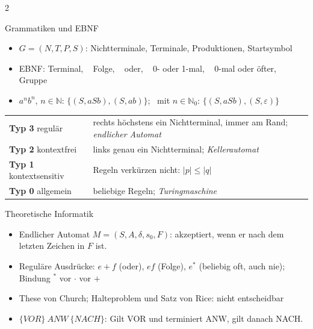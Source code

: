 \documentclass[fontsize=10pt,a4paper,DIV=20,headsepline]{scrartcl}
\newenvironment{kl}{\begin{itemize}[leftmargin=3mm, itemsep=0.1mm, topsep=0.3mm, parsep=0pt, label=\textcolor{diagramm}{\textbullet}]}{\end{itemize}}
\begin{document}
\begin{multicols}{2}
\begin{fs}{Grammatiken und EBNF}
\begin{kl}
\item $G = (N, T, P, S)$: Nichtterminale, Terminale, Produktionen, Startsymbol
\item EBNF:  Terminal, \  Folge, \  oder, \ \code{[A]} 0- oder 1-mal, \  0-mal oder öfter, \  Gruppe
\item $a^n b^n$, $n \in \mathbb{N}$: $\{(S, aSb), (S, ab)\}$; \ mit $n \in \mathbb{N}_0$: $\{(S, aSb), (S, \varepsilon)\}$
\end{kl}
\smallskip
{\scriptsize\setlength{\tabcolsep}{3pt}
\begin{tabular}{@{}p{2.3cm}p{5.6cm}@{}}
\textbf{Typ 3} regulär & rechts höchstens ein Nichtterminal, immer am Rand; \emph{endlicher Automat} \\
\textbf{Typ 2} kontextfrei & links genau ein Nichtterminal; \emph{Kellerautomat} \\
\textbf{Typ 1} kontextsensitiv & Regeln verkürzen nicht: $|p| \leq |q|$ \\
\textbf{Typ 0} allgemein & beliebige Regeln; \emph{Turingmaschine}
\end{tabular}}
\end{fs}

\begin{fs}{Theoretische Informatik}
\begin{kl}
\item Endlicher Automat $M = (S, A, \delta, s_0, F)$: akzeptiert, wenn er nach dem letzten Zeichen in $F$ ist.
\item Reguläre Ausdrücke: $e + f$ (oder), $ef$ (Folge), $e^*$ (beliebig oft, auch nie); Bindung $^*$ vor $\cdot$ vor $+$
\item These von Church; Halteproblem und Satz von Rice: nicht entscheidbar
\item $\{\mathit{VOR}\}\ \mathit{ANW}\ \{\mathit{NACH}\}$: Gilt VOR und terminiert ANW, gilt danach NACH.
\end{kl}
\end{fs}

\end{multicols}
\newpage
\end{document}
